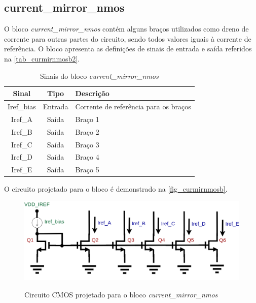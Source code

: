 \renewcommand{\NomeBloco}{\textit{current\_mirror\_nmos}}
\renewcommand{\NomeBlocoNoUnderline}{curmirnmosb}
\renewcommand{\NomePTab}{tab_\NomeBlocoNoUnderline}
\renewcommand{\NomeSTab}{tab_\NomeBlocoNoUnderline2}
\renewcommand{\NomePFig}{fig_\NomeBlocoNoUnderline}
\renewcommand{\NomeSFig}{fig_\NomeBlocoNoUnderline2}
\renewcommand{\NomeTTab}{tab_\NomeBlocoNoUnderline3}
\renewcommand{\NomeQTab}{tab_\NomeBlocoNoUnderline4}

\subsection{current\_mirror\_nmos}

O bloco \NomeBloco{} cont\'em alguns braços utilizados como dreno de corrente para outras partes do circuito, sendo todos valores iguais \`a corrente de refer\^encia. O bloco apresenta as definições de sinais de entrada e sa\'ida referidos na \autoref{\NomeSTab}.

\begin{table}[!h]
\caption{Sinais do bloco \NomeBloco}
\label{\NomeSTab}
\centering
\begin{tabular}{ccl}

    \toprule
    Sinal & Tipo    & Descrição        \\
    \midrule \midrule
    Iref\_bias   & Entrada   &  Corrente de refer\^encia para os braços \\
    \midrule
    Iref\_A   & Saída   &  Braço 1 \\
    \midrule
    Iref\_B   & Saída   &  Braço 2 \\
    \midrule
    Iref\_C   & Saída   &  Braço 3 \\
    \midrule
    Iref\_D   & Saída   &  Braço 4 \\
    \midrule
    Iref\_E   & Saída   &  Braço 5 \\
    \bottomrule
\end{tabular}
\end{table}

O circuito projetado para o bloco \'e demonstrado na \autoref{\NomePFig}.

\begin{figure}[htb]
 \centering
    \centering
    \caption{Circuito CMOS projetado para o bloco \NomeBloco} 
    \includegraphics[scale=0.3]{Circuitos/current_mirror.png}
    \label{\NomePFig}
\end{figure}

